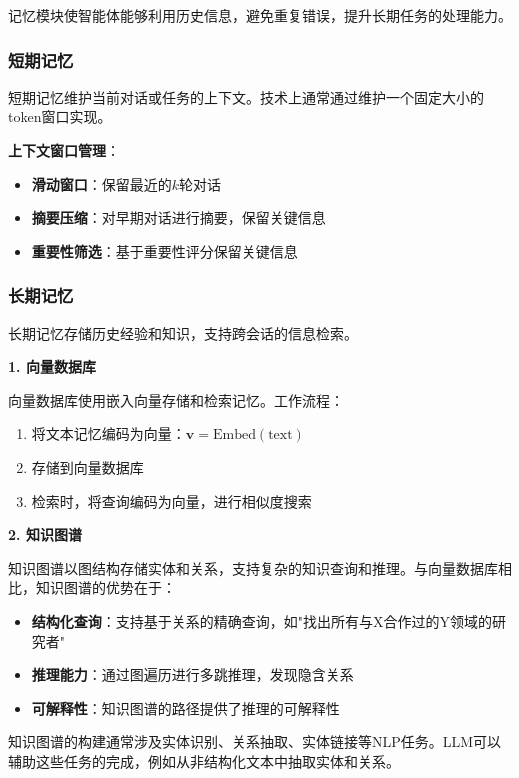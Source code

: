 记忆模块使智能体能够利用历史信息，避免重复错误，提升长期任务的处理能力。

\subsubsection{短期记忆}

短期记忆维护当前对话或任务的上下文。技术上通常通过维护一个固定大小的token窗口实现。

\textbf{上下文窗口管理}：
\begin{itemize}[leftmargin=2em]
    \item \textbf{滑动窗口}：保留最近的$k$轮对话
    \item \textbf{摘要压缩}：对早期对话进行摘要，保留关键信息
    \item \textbf{重要性筛选}：基于重要性评分保留关键信息
\end{itemize}

\subsubsection{长期记忆}

长期记忆存储历史经验和知识，支持跨会话的信息检索。

\textbf{1. 向量数据库}

向量数据库使用嵌入向量存储和检索记忆。工作流程：

\begin{enumerate}[leftmargin=2em]
    \item 将文本记忆编码为向量：$\mathbf{v} = \text{Embed}(\text{text})$
    \item 存储到向量数据库
    \item 检索时，将查询编码为向量，进行相似度搜索
\end{enumerate}

\textbf{2. 知识图谱}

知识图谱以图结构存储实体和关系，支持复杂的知识查询和推理。与向量数据库相比，知识图谱的优势在于：
\begin{itemize}[leftmargin=2em]
    \item \textbf{结构化查询}：支持基于关系的精确查询，如"找出所有与X合作过的Y领域的研究者"
    \item \textbf{推理能力}：通过图遍历进行多跳推理，发现隐含关系
    \item \textbf{可解释性}：知识图谱的路径提供了推理的可解释性
\end{itemize}

知识图谱的构建通常涉及实体识别、关系抽取、实体链接等NLP任务。LLM可以辅助这些任务的完成，例如从非结构化文本中抽取实体和关系。

